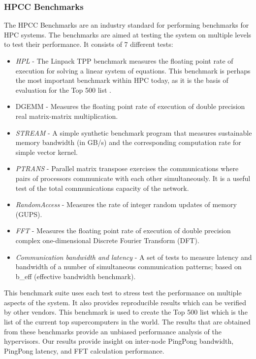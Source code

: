 \subsubsection{HPCC Benchmarks}
The HPCC Benchmarks \cite{luszczek2006hpc, Dongarra2010} are an industry standard for performing benchmarks for HPC systems. The benchmarks are aimed at testing the system on multiple levels to test their performance. It consists of 7 different tests:

\begin{itemize}
\item {\em HPL} - The Linpack TPP benchmark measures the floating point rate of execution for solving a linear system of equations.  This benchmark is perhaps the most important benchmark within HPC today, as it is the basis of evaluation for the Top 500 list \cite{www-top500}.
 \item {DGEMM} - Measures the floating point rate of execution of double precision real matrix-matrix multiplication.
\item {\em STREAM} - A simple synthetic benchmark program that measures sustainable memory bandwidth (in GB/s) and the corresponding computation rate for simple vector kernel.
\item {\em PTRANS} - Parallel matrix transpose exercises the communications where pairs of processors communicate with each other simultaneously. It is a useful test of the total communications capacity of the network.
\item {\em RandomAccess} - Measures the rate of integer random updates of memory (GUPS).
\item {\em FFT} - Measures the floating point rate of execution of double precision complex one-dimensional Discrete Fourier Transform (DFT).
\item {\em Communication bandwidth and latency} - A set of tests to measure latency and bandwidth of a number of simultaneous communication patterns; based on b\_eff (effective bandwidth benchmark).
\end{itemize}


This benchmark suite uses each test to stress test the performance on multiple aspects of the system. It also provides reproducible results which can be verified by other vendors. This benchmark is used to create the Top 500 list \cite{www-top500} which is the list of the current top supercomputers in the world. The results that are obtained from these benchmarks provide an unbiased performance analysis of the hypervisors. Our results provide insight on inter-node PingPong bandwidth, PingPong latency, and FFT calculation performance. 

